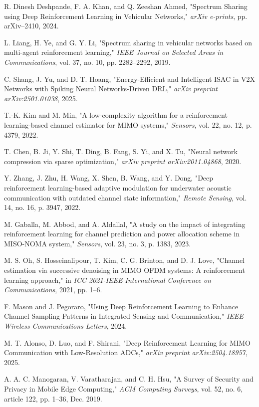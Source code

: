 \documentclass[journal,twocolumn]{IEEEtran}
\begin{document}
\begin{thebibliography}{30}
R. Dinesh Deshpande, F. A. Khan, and Q. Zeeshan Ahmed, "Spectrum Sharing using Deep Reinforcement Learning in Vehicular Networks," \emph{arXiv e-prints}, pp. arXiv--2410, 2024.

L. Liang, H. Ye, and G. Y. Li, "Spectrum sharing in vehicular networks based on multi-agent reinforcement learning," \emph{IEEE Journal on Selected Areas in Communications}, vol. 37, no. 10, pp. 2282--2292, 2019.

C. Shang, J. Yu, and D. T. Hoang, "Energy-Efficient and Intelligent ISAC in V2X Networks with Spiking Neural Networks-Driven DRL," \emph{arXiv preprint arXiv:2501.01038}, 2025.

T.-K. Kim and M. Min, "A low-complexity algorithm for a reinforcement learning-based channel estimator for MIMO systems," \emph{Sensors}, vol. 22, no. 12, p. 4379, 2022.

T. Chen, B. Ji, Y. Shi, T. Ding, B. Fang, S. Yi, and X. Tu, "Neural network compression via sparse optimization," \emph{arXiv preprint arXiv:2011.04868}, 2020.

Y. Zhang, J. Zhu, H. Wang, X. Shen, B. Wang, and Y. Dong, "Deep reinforcement learning-based adaptive modulation for underwater acoustic communication with outdated channel state information," \emph{Remote Sensing}, vol. 14, no. 16, p. 3947, 2022.

M. Gaballa, M. Abbod, and A. Aldallal, "A study on the impact of integrating reinforcement learning for channel prediction and power allocation scheme in MISO-NOMA system," \emph{Sensors}, vol. 23, no. 3, p. 1383, 2023.

M. S. Oh, S. Hosseinalipour, T. Kim, C. G. Brinton, and D. J. Love, "Channel estimation via successive denoising in MIMO OFDM systems: A reinforcement learning approach," in \emph{ICC 2021-IEEE International Conference on Communications}, 2021, pp. 1--6.

F. Mason and J. Pegoraro, "Using Deep Reinforcement Learning to Enhance Channel Sampling Patterns in Integrated Sensing and Communication," \emph{IEEE Wireless Communications Letters}, 2024.

M. T. Alonso, D. Luo, and F. Shirani, "Deep Reinforcement Learning for MIMO Communication with Low-Resolution ADCs," \emph{arXiv preprint arXiv:2504.18957}, 2025.

A. A. C. Manogaran, V. Varatharajan, and C. H. Hsu, "A Survey of Security and Privacy in Mobile Edge Computing," \emph{ACM Computing Surveys}, vol. 52, no. 6, article 122, pp. 1--36, Dec. 2019.


\end{thebibliography}
\end{document}
